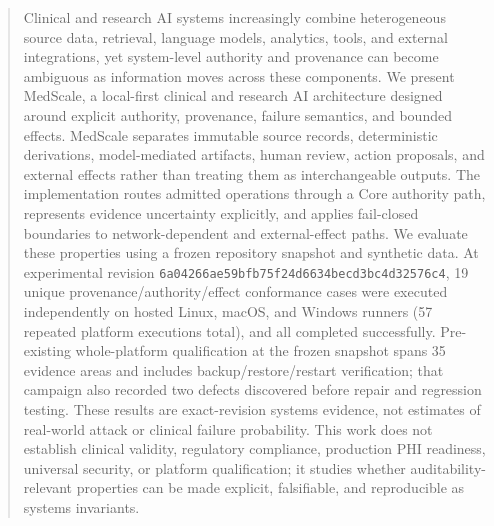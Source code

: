 \begin{abstract}
Clinical and research AI systems increasingly combine heterogeneous source data, retrieval, language models, analytics, tools, and external integrations, yet system-level authority and provenance can become ambiguous as information moves across these components. We present MedScale, a local-first clinical and research AI architecture designed around explicit authority, provenance, failure semantics, and bounded effects. MedScale separates immutable source records, deterministic derivations, model-mediated artifacts, human review, action proposals, and external effects rather than treating them as interchangeable outputs. The implementation routes admitted operations through a Core authority path, represents evidence uncertainty explicitly, and applies fail-closed boundaries to network-dependent and external-effect paths. We evaluate these properties using a frozen repository snapshot and synthetic data. At experimental revision \texttt{6a04266ae59bfb75f24d6634becd3bc4d32576c4}, 19 unique provenance/authority/effect conformance cases were executed independently on hosted Linux, macOS, and Windows runners (57 repeated platform executions total), and all completed successfully. Pre-existing whole-platform qualification at the frozen snapshot spans 35 evidence areas and includes backup/restore/restart verification; that campaign also recorded two defects discovered before repair and regression testing. These results are exact-revision systems evidence, not estimates of real-world attack or clinical failure probability. This work does not establish clinical validity, regulatory compliance, production PHI readiness, universal security, or platform qualification; it studies whether auditability-relevant properties can be made explicit, falsifiable, and reproducible as systems invariants.
\end{abstract}
